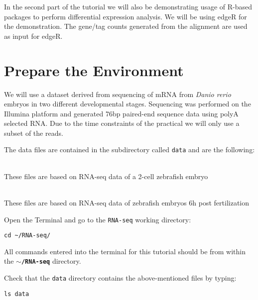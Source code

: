 In the second part of the tutorial we will also be demonstrating usage of R-based packages to perform differential expression analysis.
We will be using edgeR for the demonstration. The gene/tag counts generated from the alignment are used as input for edgeR.
\section{Prepare the Environment}
We will use a dataset derived from sequencing of mRNA from \textit{Danio rerio} embryos
in two different developmental stages. Sequencing was performed on the Illumina
platform and generated 76bp paired-end sequence data using polyA selected RNA.
Due to the time constraints of the practical we will only use a subset of the
reads.

The data files are contained in the subdirectory called \texttt{data} and are
the following:
\begin{description}[style=multiline,labelindent=1.5cm,align=left,leftmargin=2.5cm]
  \item[\texttt{2cells\_1.fastq} and \texttt{2cells\_2.fastq}] \hfill\\
 These files are based on RNA-seq data of a 2-cell zebrafish embryo
  \item[\texttt{6h\_1.fastq} and \texttt{6h\_2.fastq}] \hfill\\
 These files are based on RNA-seq data of zebrafish embryos 6h post
 fertilization
\end{description}

\begin{steps}
Open the Terminal and go to the \texttt{RNA-seq} working directory:
\begin{lstlisting}
cd ~/RNA-seq/
\end{lstlisting}
\end{steps}

\begin{warning}
  All commands entered into the terminal for this tutorial should be from within the
  \textbf{\texttt{$\sim$/RNA-seq}} directory.
\end{warning}

\begin{steps}
Check that the \texttt{data} directory contains the above-mentioned files by typing:
\begin{lstlisting}
ls data
\end{lstlisting}
\end{steps}

